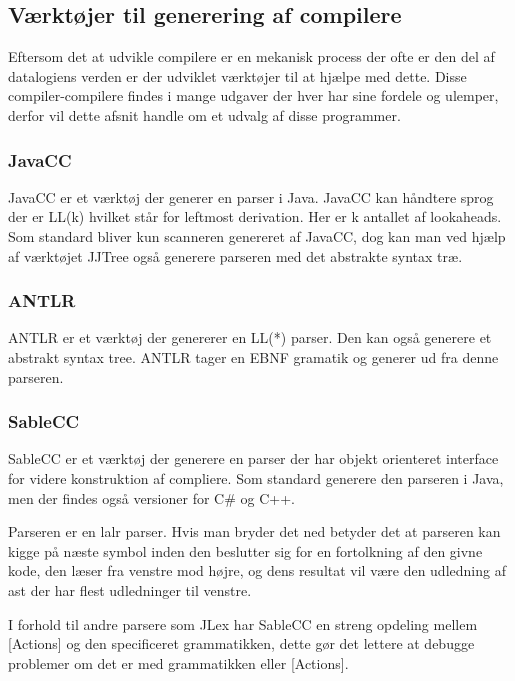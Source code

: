 \subsection{Værktøjer til generering af compilere}
\label{ssec:toolsforcc}

Eftersom det at udvikle compilere er en mekanisk process der ofte er den del af datalogiens verden er der udviklet værktøjer til at hjælpe med dette. Disse compiler-compilere findes i mange udgaver der hver har sine fordele og ulemper, derfor vil dette afsnit handle om et udvalg af disse programmer.

\subsubsection{JavaCC}
JavaCC er et værktøj der generer en parser i Java. JavaCC kan håndtere sprog der er LL(k) hvilket står for leftmost derivation. Her er k antallet af lookaheads. Som standard bliver kun scanneren genereret af JavaCC, dog kan man ved hjælp af værktøjet JJTree også generere parseren med det abstrakte syntax træ.

\subsubsection{ANTLR}
ANTLR er et værktøj der genererer en LL(*) parser. Den kan også generere et abstrakt syntax tree. ANTLR tager en EBNF gramatik og generer ud fra denne parseren.

\subsubsection{SableCC}
SableCC er et værktøj der generere en parser der har objekt orienteret interface for videre konstruktion af compliere. Som standard generere den parseren i Java, men der findes også versioner for C\# og C++.
    
    
Parseren er en \gls{lalr} parser. Hvis man bryder det ned betyder det at parseren kan kigge på næste symbol inden den beslutter sig for en fortolkning af den givne kode, den læser fra venstre mod højre, og dens resultat vil være den udledning af \gls{ast} der har flest udledninger til venstre.
    
I forhold til andre parsere som JLex har SableCC en streng opdeling mellem [Actions] og den specificeret grammatikken, dette gør det lettere at debugge problemer om det er med grammatikken eller [Actions].